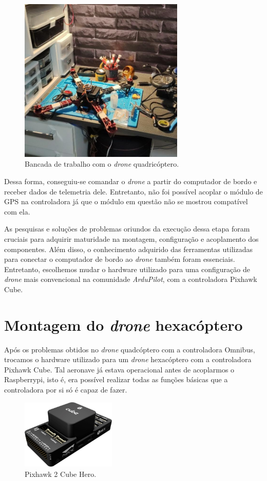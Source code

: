 \documentclass[12pt,a4paper,oneside]{book}
\begin{document}
%
\begin{figure}[!htbp]
  \centering
  \includegraphics[width=0.7\textwidth]{Images/Desenvolvimento/omnibus_drone.jpeg}
  \caption{Bancada de trabalho com o \textit{drone} quadricóptero.}
  \label{fig:omnibus_drone.jpeg.0}
\end{figure}
%
Dessa forma, conseguiu-se comandar o \textit{drone} a partir do computador de bordo e receber dados de telemetria dele. Entretanto, não foi possível acoplar o módulo de GPS na controladora já que o módulo em questão não se mostrou compatível com ela.

As pesquisas e soluções de problemas oriundos da execução dessa etapa foram cruciais para adquirir maturidade na montagem, configuração e acoplamento dos componentes. Além disso, o conhecimento adquirido das ferramentas utilizadas para conectar o computador de bordo ao \textit{drone} também foram essenciais. Entretanto, escolhemos mudar o hardware utilizado para uma configuração de \textit{drone} mais convencional na comunidade \textit{ArduPilot}, com a controladora Pixhawk Cube. 

\section{Montagem do \textit{drone} hexacóptero}

Após os problemas obtidos no \textit{drone} quadcóptero com a controladora Omnibus, trocamos o hardware utilizado para um \textit{drone} hexacóptero com a controladora Pixhawk Cube. Tal aeronave já estava operacional antes de acoplarmos o Raspberrypi, isto é, era possível realizar todas as funções básicas que a controladora por si só é capaz de fazer.
%
\begin{figure}[!htbp]
  \centering
  \includegraphics[width=0.4\textwidth]{Images/Desenvolvimento/pixhawk2_cube_hero.png}
  \caption{Pixhawk 2 Cube Hero.}
  \label{fig:pixhawk2_cube_hero.png.0}
\end{figure}
%
\end{document}
